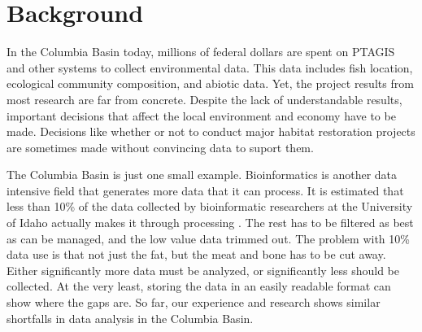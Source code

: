 

 


\section{Background}
In the Columbia Basin today, millions of federal dollars are spent on PTAGIS
and other systems to collect environmental data.  This data includes fish
location, ecological community composition, and abiotic data. Yet, the project
results from most research are far from concrete. Despite the lack of
understandable results, important decisions that affect the local environment
and economy have to be made. Decisions like whether or not to conduct major
habitat restoration projects are sometimes made without convincing data to
suport them. 

The Columbia Basin is just one small example. Bioinformatics is another 
data intensive field that generates more data that it can process. It is 
estimated that less than 10\% of the data collected by bioinformatic 
researchers at the University of Idaho actually makes it through processing
\cite{foster}. The rest has to be filtered as best as can be managed, and the 
low value data trimmed out. The problem with 10\% data use is that not just 
the fat, but the meat and bone has to be cut away. Either significantly more
data must be analyzed, or significantly less should be collected. At the very
least, storing the data in an easily readable format can show where the 
gaps are. So far, our experience and research shows similar shortfalls in 
data analysis in the Columbia Basin.

